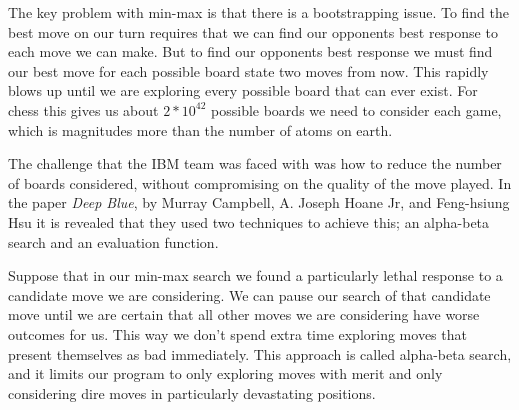 \documentclass[12pt]{IEEEtran}
\begin{document}
\par The key problem with min-max is that there is a bootstrapping issue. To find the best move on our turn requires that we can find our opponents best response to each move we can make. But to find our opponents best response we must find our best move for each possible board state two moves from now. This rapidly blows up until we are exploring every possible board that can ever exist. For chess this gives us about $2 * 10^{42}$ possible boards we need to consider each game, which is magnitudes more than the number of atoms on earth. 

\par The challenge that the IBM team was faced with was how to reduce the number of boards considered, without compromising on the quality of the move played. In the paper \textit{Deep Blue}, by Murray Campbell, A. Joseph Hoane Jr, and  Feng-hsiung Hsu it is revealed that they used two techniques to achieve this; an alpha-beta search and an evaluation function. 

\par Suppose that in our min-max search we found a particularly lethal response to a candidate move we are considering. We can pause our search of that candidate move until we are certain that all other moves we are considering have worse outcomes for us. This way we don't spend extra time exploring moves that present themselves as bad immediately. This approach is called alpha-beta search, and it limits our program to only exploring moves with merit and only considering dire moves in particularly devastating positions. 
\end{document}
